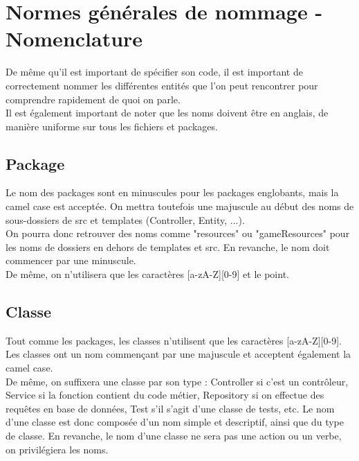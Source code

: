 \documentclass{article}
\begin{document}
\newpage
    \section{Normes générales de nommage - Nomenclature}

        De même qu'il est important de spécifier son code, il est important de correctement nommer les différentes entités que l'on peut rencontrer pour comprendre rapidement de quoi on parle.\\
        \indent Il est également important de noter que les noms doivent être en anglais, de manière uniforme sur tous les fichiers et packages.
        
        \subsection{Package}
            Le nom des packages sont en minuscules pour les packages englobants, mais la camel case est acceptée. On mettra toutefois une majuscule au début des noms de sous-dossiers de src et templates (Controller, Entity, ...).\\
            \indent On pourra donc retrouver des noms comme "resources" ou "gameResources" pour les noms de dossiers en dehors de templates et src. En revanche, le nom doit commencer par une minuscule. \\
            De même, on n'utilisera que les caractères [a-zA-Z][0-9] et le point.

        \subsection{Classe}
            Tout comme les packages, les classes n'utilisent que les caractères [a-zA-Z][0-9].\\
            Les classes ont un nom commençant par une majuscule et acceptent également la camel case. \\
            De même, on suffixera une classe par son type : Controller si c'est un contrôleur, Service si la fonction contient du code métier, Repository si on effectue des requêtes en base de données, Test s'il s'agit d'une classe de tests, etc. Le nom d'une classe est donc composée d'un nom simple et descriptif, ainsi que du type de classe. En revanche, le nom d'une classe ne sera pas une action ou un verbe, on privilégiera les noms.\\
\end{document}

